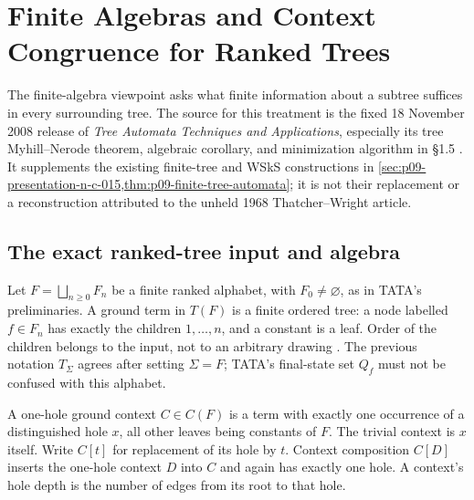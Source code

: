 \section{Finite Algebras and Context Congruence for Ranked Trees}
\label{sec:p09-finite-tree-algebra}

The finite-algebra viewpoint asks what finite information about a subtree
suffices in every surrounding tree. The source for this treatment is the
fixed 18 November 2008 release of \emph{Tree Automata Techniques and
Applications}, especially its tree Myhill--Nerode theorem, algebraic
corollary, and minimization algorithm in \S1.5
\parencite[pp.~35--37]{ComonEtAl2007}.
It supplements the existing finite-tree and WSkS constructions in
\cref{sec:p09-presentation-n-c-015,thm:p09-finite-tree-automata};
it is not their replacement or a reconstruction attributed to the
unheld 1968 Thatcher--Wright article.

\subsection{The exact ranked-tree input and algebra}
\label{sec:p09-tree-algebra-input}

Let \(F=\bigsqcup_{n\geq0}F_n\) be a finite ranked alphabet, with
\(F_0\ne\varnothing\), as in TATA's preliminaries. A ground term in
\(T(F)\) is a finite ordered tree: a node labelled \(f\in F_n\)
has exactly the children \(1,\ldots,n\), and a constant is a leaf.
Order of the children belongs to the input, not to an arbitrary drawing
\parencite[pp.~15--17, 20--21]{ComonEtAl2007}.
The previous notation \(T_\Sigma\) agrees after setting \(\Sigma=F\);
TATA's final-state set \(Q_f\) must not be confused with this alphabet.

A one-hole ground context \(C\in C(F)\) is a term with exactly one
occurrence of a distinguished hole \(x\), all other leaves being constants
of \(F\). The trivial context is \(x\) itself. Write \(C[t]\) for
replacement of its hole by \(t\). Context composition \(C[D]\) inserts
the one-hole context \(D\) into \(C\) and again has exactly one hole.
A context's hole depth is the number of edges from its root to that hole.


